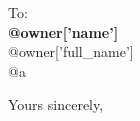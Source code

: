 \documentclass[paper=a4,fontsize=11pt,DIV=12]{scrlttr2}
\begin{document}
\begin{letter}{To:\\
			\textbf{@{owner['name']}}\\
			@{owner['full_name']}\\
@{a}\\
		}
\begin{adjustwidth}{-4em}{}
{{%
			
		\endtabular
	\end{adjustwidth}				
		\closing{Yours sincerely,}
	\end{letter}
\end{document}
